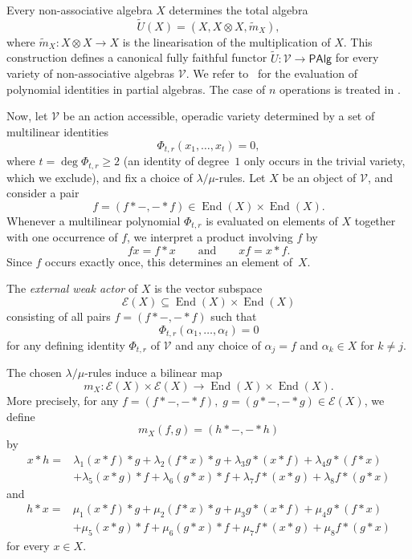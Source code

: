 \documentclass[reqno,a4paper]{amsart}
\theoremstyle{plain}
\theoremstyle{definition}
\theoremstyle{remark}
\numberwithin{equation}{section}
\newcommand{\E}{\mathcal{E}}
\newcommand{\V}{\mathcal{V}}
\DeclareMathOperator{\End}{End}
\newcommand{\PAlg}{\ensuremath{\mathsf{PAlg}}}
\begin{document}
Every non-associative algebra $X$ determines the total algebra
\[
\widetilde U(X)=(X,X\otimes X,\widetilde m_X),
\]
where $\widetilde m_X\colon X\otimes X\to X$ is the linearisation of the multiplication of $X$. This construction defines a canonical fully faithful functor $\widetilde U\colon\V\to\PAlg$ for every variety of non-associative algebras $\V$. We refer to~\cite[Section~4.21]{SurveyActions} for the evaluation of polynomial identities in partial algebras. The case of $n$ operations is treated in .

Now, let $\V$ be an action accessible, operadic variety determined by a set of multilinear identities
\[
\Phi_{t,r}(x_1,\ldots,x_t)=0,
\]
where $t=\deg \Phi_{t,r}\geq2$ (an identity of degree~$1$ only occurs in the trivial variety, which we exclude), and fix a choice of $\lambda/\mu$-rules. Let $X$ be an object of $\V$, and consider a pair
\[
f=(f\ast-,-\ast f)\in\End(X)\times\End(X).
\]
Whenever a multilinear polynomial $\Phi_{t,r}$ is evaluated on elements of $X$ together with one occurrence of $f$, we interpret a product involving $f$ by
\[
fx=f\ast x
\qquad\text{and}\qquad
xf=x\ast f.
\]
Since $f$ occurs exactly once, this determines an element of~$X$.

The \emph{external weak actor} of $X$ is the vector subspace
\[
\E(X)\subseteq\End(X)\times\End(X)
\]
consisting of all pairs $f=(f\ast-,-\ast f)$ such that
\[
\Phi_{t,r}(\alpha_1,\ldots,\alpha_t)=0
\]
for any defining identity $\Phi_{t,r}$ of $\V$ and any choice of $\alpha_j=f$ and $\alpha_k\in X$ for $k\neq j$.

The chosen $\lambda/\mu$-rules induce a bilinear map
\[
m_X\colon\E(X)\times\E(X)\to\End(X)\times\End(X).
\]
More precisely, for any $f=(f\ast-,-\ast f), \;
g=(g\ast-,-\ast g)\in\E(X)$, we define
\[
m_X(f,g)=(h\ast-,-\ast h)
\]
by
\begin{align*}
x\ast h
={}&\lambda_1(x\ast f)\ast g+\lambda_2(f\ast x)\ast g+\lambda_3g\ast(x\ast f)+\lambda_4g\ast(f\ast x)\\
&+\lambda_5(x\ast g)\ast f+\lambda_6(g\ast x)\ast f+\lambda_7f\ast(x\ast g)+\lambda_8f\ast(g\ast x)
\end{align*}
and
\begin{align*}
h\ast x
={}&\mu_1(x\ast f)\ast g+\mu_2(f\ast x)\ast g+\mu_3g\ast(x\ast f)+\mu_4g\ast(f\ast x)\\
&+\mu_5(x\ast g)\ast f+\mu_6(g\ast x)\ast f+\mu_7f\ast(x\ast g)+\mu_8f\ast(g\ast x)
\end{align*}
for every $x\in X$.
\end{document}
